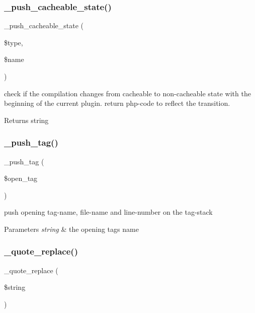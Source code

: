 \subsubsection{\texorpdfstring{\+\_\+push\+\_\+cacheable\+\_\+state()}{\_push\_cacheable\_state()}}
{\footnotesize\ttfamily \+\_\+push\+\_\+cacheable\+\_\+state (\begin{DoxyParamCaption}\item[{}]{\$type,  }\item[{}]{\$name }\end{DoxyParamCaption})}

check if the compilation changes from cacheable to non-\/cacheable state with the beginning of the current plugin. return php-\/code to reflect the transition. \begin{DoxyReturn}{Returns}
string 
\end{DoxyReturn}
\mbox{\label{class_smarty___compiler_a04fd5536a55810e196b1da7b119eb5e6}} 
\subsubsection{\texorpdfstring{\+\_\+push\+\_\+tag()}{\_push\_tag()}}
{\footnotesize\ttfamily \+\_\+push\+\_\+tag (\begin{DoxyParamCaption}\item[{}]{\$open\+\_\+tag }\end{DoxyParamCaption})}

push opening tag-\/name, file-\/name and line-\/number on the tag-\/stack 
\begin{DoxyParams}{Parameters}
{\em string} & the opening tag\textquotesingle{}s name \\
\hline
\end{DoxyParams}
\mbox{\label{class_smarty___compiler_af44c0aadf5d97fe891cc281c1de622e5}} 
\subsubsection{\texorpdfstring{\+\_\+quote\+\_\+replace()}{\_quote\_replace()}}
{\footnotesize\ttfamily \+\_\+quote\+\_\+replace (\begin{DoxyParamCaption}\item[{}]{\$string }\end{DoxyParamCaption})}


